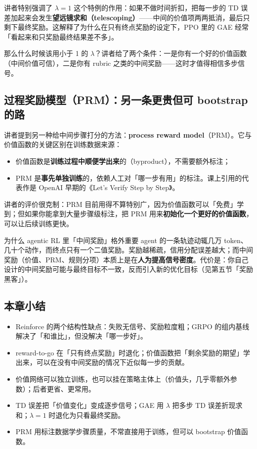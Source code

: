\documentclass[a4paper]{article}
\begin{document}
讲者特别强调了 $\lambda=1$ 这个特例的作用：如果不做时间折扣，把每一步的 TD 误差加起来会发生\textbf{望远镜求和（telescoping）}——中间的价值项两两抵消，最后只剩下最终奖励。这解释了为什么在只有终点奖励的设定下，PPO 里的 GAE 经常「看起来和只奖励最终结果差不多」。

那么什么时候该用小于 1 的 $\lambda$？讲者给了两个条件：一是你有一个好的价值函数（中间价值可信），二是你有 rubric 之类的中间奖励——这时才值得相信多步信号。

\subsection{过程奖励模型（PRM）：另一条更贵但可 bootstrap 的路}

讲者提到另一种给中间步骤打分的方法：\textbf{process reward model}（PRM）。它与价值函数的关键区别在训练数据来源：

\begin{itemize}
\item 价值函数是\textbf{训练过程中顺便学出来}的（byproduct），不需要额外标注；
\item PRM 是\textbf{事先单独训练}的，依赖人工对「哪一步有用」的标注。课上引用的代表作是 OpenAI 早期的《Let's Verify Step by Step》。
\end{itemize}

讲者的评价很克制：PRM 目前用得不算特别广，因为价值函数可以「免费」学到；但如果你能拿到大量步骤级标注，把 PRM 用来\textbf{初始化一个更好的价值函数}，可以让后续训练更快。

\begin{knowledgebox}{为什么 agentic RL 里「中间奖励」格外重要}
agent 的一条轨迹动辄几万 token、几十个动作，而终点只有一个二值奖励。奖励越稀疏，信用分配误差越大；而中间奖励（价值、PRM、规则分项）本质上是在\textbf{人为提高信号密度}。代价是：你自己设计的中间奖励可能与最终目标不一致，反而引入新的优化目标（见第五节「奖励黑客」）。
\end{knowledgebox}

\subsection{本章小结}

\begin{itemize}
\item Reinforce 的两个结构性缺点：失败无信号、奖励粒度粗；GRPO 的组内基线解决了「和谁比」，但没解决「哪一步好」。
\item reward-to-go 在「只有终点奖励」时退化；价值函数把「剩余奖励的期望」学出来，可以在没有中间奖励的情况下近似每一步的贡献。
\item 价值网络可以独立训练，也可以挂在策略主体上（价值头，几乎零额外参数）；后者更省、更常用。
\item TD 误差把「价值变化」变成逐步信号；GAE 用 $\lambda$ 把多步 TD 误差折现求和；$\lambda=1$ 时退化为只看最终奖励。
\item PRM 用标注数据学步骤质量，不常直接用于训练，但可以 bootstrap 价值函数。
\end{itemize}
\end{document}
